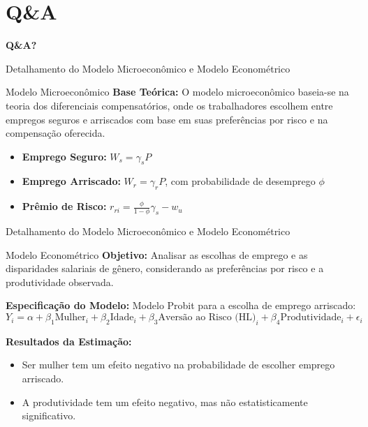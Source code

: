 \documentclass[aspectratio=169, xcolor={dvipsnames}, 10pt, brazil]{beamer}
\begin{document}
\section{Q\&A}
\begin{frame}[plain] %
    \begin{center}
        \vspace*{2cm} %
        \textbf{\Huge Q\&A?} %
    \end{center}
\end{frame}

\begin{frame}{Detalhamento do Modelo Microeconômico e Modelo Econométrico}

    \begin{block}{Modelo Microeconômico}
        \textbf{Base Teórica:} O modelo microeconômico baseia-se na teoria dos diferenciais compensatórios, onde os trabalhadores escolhem entre empregos seguros e arriscados com base em suas preferências por risco e na compensação oferecida.
        
        \begin{itemize}
            \item \textbf{Emprego Seguro:} \( W_s = \gamma_s P \)
            \item \textbf{Emprego Arriscado:} \( W_r = \gamma_r P \), com probabilidade de desemprego \( \phi \)
            \item \textbf{Prêmio de Risco:} \( r_{ri} = \frac{\phi}{1-\phi}\gamma_s - w_u \)
        \end{itemize}
    \end{block}

\end{frame}

\begin{frame}{Detalhamento do Modelo Microeconômico e Modelo Econométrico}

    \begin{block}{Modelo Econométrico}
        \textbf{Objetivo:} Analisar as escolhas de emprego e as disparidades salariais de gênero, considerando as preferências por risco e a produtividade observada.
        
        \textbf{Especificação do Modelo:} Modelo Probit para a escolha de emprego arriscado:
        \[
        Y_i = \alpha + \beta_1 \text{Mulher}_i + \beta_2 \text{Idade}_i + \beta_3 \text{Aversão ao Risco (HL)}_i + \beta_4 \text{Produtividade}_i + \epsilon_i
        \]
        
        \textbf{Resultados da Estimação:}
        \begin{itemize}
            \item Ser mulher tem um efeito negativo na probabilidade de escolher emprego arriscado.
            \item A produtividade tem um efeito negativo, mas não estatisticamente significativo.
        \end{itemize}
    \end{block}

\end{frame}
\end{document}
